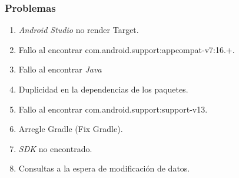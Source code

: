\begin{frame}
	\frametitle{Problemas}
		\begin{enumerate}
			\item {\it Android Studio} no render Target.
			\item Fallo al encontrar {\ttfamily com.android.support:appcompat-v7:16.+}.
			\item Fallo al encontrar {\it Java}
			\item Duplicidad en la dependencias de los paquetes.
			\item Fallo al encontrar {\ttfamily com.android.support:support-v13}.
			\item Arregle {\ttfamily Gradle} (Fix {\ttfamily Gradle}).
			\item {\it SDK} no encontrado.
			\item Consultas a la espera de modificación de datos.
		\end{enumerate}
	\endblock{}
\end{frame}